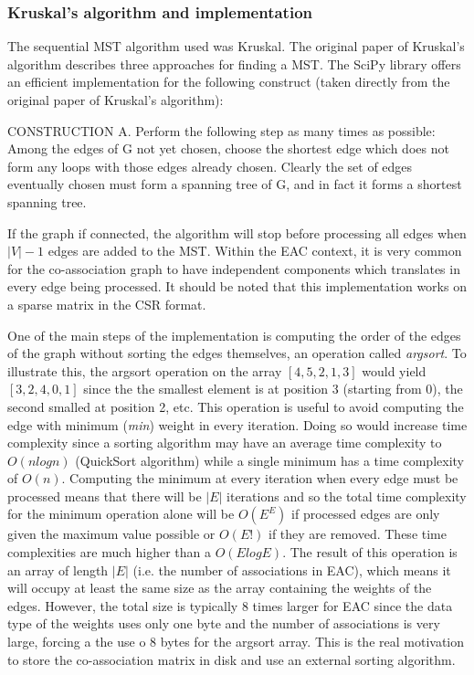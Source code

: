\subsubsection{Kruskal's algorithm and implementation}

The sequential MST algorithm used was Kruskal.
The original paper of Kruskal's \cite{kruskal1956shortest} algorithm describes three approaches for finding a MST.
The SciPy library offers an efficient implementation for the following construct (taken directly from the original paper of Kruskal's algorithm):
\begin{displayquote}
CONSTRUCTION A. Perform the following step as many times as possible: Among the edges of G not yet chosen, choose the shortest edge which does not form any loops with those edges already chosen. Clearly the set of edges eventually chosen must form a spanning tree of G, and in fact it forms a shortest spanning tree.
\end{displayquote}
If the graph if connected, the algorithm will stop before processing all edges when $|V| - 1$ edges are added to the MST.
Within the EAC context, it is very common for the co-association graph to have independent components which translates in every edge being processed.
It should be noted that this implementation works on a sparse matrix in the CSR format.

One of the main steps of the implementation is computing the order of the edges of the graph without sorting the edges themselves, an operation called \emph{argsort}.
To illustrate this, the argsort operation on the array $ \left [  4 , 5 , 2 , 1, 3 \right ]$ would yield $ \left [  3 , 2 , 4, 0 , 1 \right ]$ since the the smallest element is at position 3 (starting from 0), the second smalled at position 2, etc.
This operation is useful to avoid computing the edge with minimum (\emph{min}) weight in every iteration.
Doing so would increase time complexity since a sorting algorithm may have an average time complexity to $O(n log n)$ (QuickSort algorithm) while a single minimum has a time complexity of $O(n)$.
Computing the minimum at every iteration when every edge must be processed means that there will be $|E|$ iterations and so the total time complexity for the minimum operation alone will be $O(E ^ E)$ if processed edges are only given the maximum value possible or $O(E!)$ if they are removed.
These time complexities are much higher than a $O(E log E)$.
The result of this operation is an array of length $|E|$ (i.e. the number of associations in EAC), which means it will occupy at least the same size as the array containing the weights of the edges.
However, the total size is typically 8 times larger for EAC since the data type of the weights uses only one byte and the number of associations is very large, forcing a the use o 8 bytes for the argsort array.
This is the real motivation to store the co-association matrix in disk and use an external sorting algorithm.

